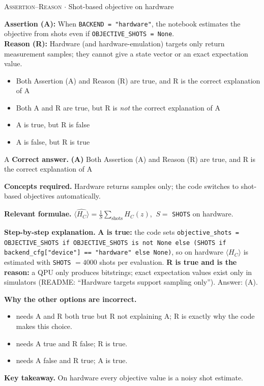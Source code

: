 \documentclass[11pt,a4paper]{article}
\newcommand{\optlabel}[1]{\textbf{(#1)}}
\newcommand{\correctlabel}[1]{\textcolor{okgreen}{\textbf{(#1)}\,\ding{51}}}
\newenvironment{qitem}[1]{\begin{list}{}{\setlength{\leftmargin}{3.3em}\setlength{\labelwidth}{3.1em}%
  \setlength{\labelsep}{0.2em}\setlength{\topsep}{3pt}\setlength{\parsep}{3pt}}\item[\textbf{Q.#1}\hfill]}{\end{list}}
\newcommand{\qsep}{\par\vspace{2pt}{\color{black!15}\hrule}\vspace{4pt}}
\newcommand{\qmeta}[2]{{\footnotesize\color{black!60}\textsc{#1} \;$\cdot$\; #2}\par}
\begin{document}
\begin{qitem}{70}
\qmeta{Assertion--Reason}{Shot-based objective on hardware}
\textbf{Assertion (A):} When \texttt{BACKEND = "hardware"}, the notebook estimates the objective from shots even if
\texttt{OBJECTIVE\_SHOTS = None}.\\[1mm]
\textbf{Reason (R):} Hardware (and hardware-emulation) targets only return measurement samples; they cannot give a state vector or an
exact expectation value.
\begin{itemize}[leftmargin=2.6em, labelsep=0.4em, itemsep=2pt, topsep=3pt]
\item[\correctlabel{A}] Both Assertion (A) and Reason (R) are true, and R is the correct explanation of A
\item[\optlabel{B}] Both A and R are true, but R is \emph{not} the correct explanation of A
\item[\optlabel{C}] A is true, but R is false
\item[\optlabel{D}] A is false, but R is true
\end{itemize}
\end{qitem}
\begin{solbox}{A}
\textbf{\color{brand}Correct answer.} \textcolor{okgreen}{\textbf{(A)}} Both Assertion (A) and Reason (R) are true, and R is the correct explanation of A

\textbf{\color{brand}Concepts required.} Hardware returns samples only; the code switches to shot-based objectives automatically.

\textbf{\color{brand}Relevant formulae.} $\widehat{\langle H_C\rangle} = \tfrac1S\sum_{\text{shots}} H_C(z)$, $\ S = $ \texttt{SHOTS} on hardware.

\textbf{\color{brand}Step-by-step explanation.} \textbf{A is true:} the code sets
\texttt{objective\_shots = OBJECTIVE\_SHOTS if OBJECTIVE\_SHOTS is not None else (SHOTS if backend\_cfg["device"] == "hardware" else None)},
so on hardware $\langle H_C\rangle$ is estimated with \texttt{SHOTS} $= 4000$ shots per evaluation.
\textbf{R is true and is the reason:} a QPU only produces bitstrings; exact expectation values exist only in simulators
(README: ``Hardware targets support sampling only''). Answer: (A).

\textbf{\color{brand}Why the other options are incorrect.}
\begin{itemize}[leftmargin=2.4em, itemsep=1pt, topsep=2pt]
\item[\textbf{(B)}] needs A and R both true but R not explaining A; R is exactly why the code makes this choice.
\item[\textbf{(C)}] needs A true and R false; R is true.
\item[\textbf{(D)}] needs A false and R true; A is true.
\end{itemize}
\textbf{\color{brand}Key takeaway.} On hardware every objective value is a noisy shot estimate.
\end{solbox}
\qsep
\end{document}
